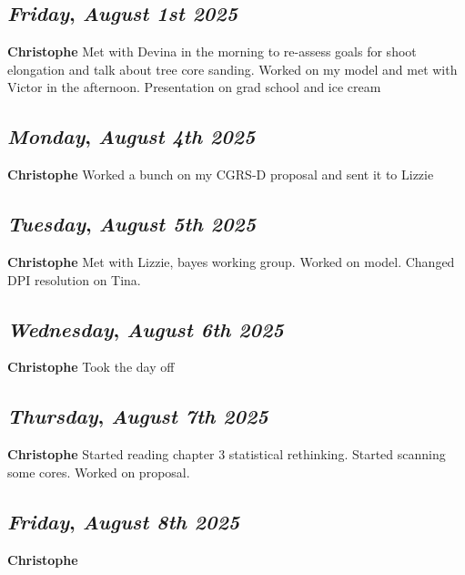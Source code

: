 \begin{center}
\section*{\month}
\end{center}

\def\day{\textit{August 1st 2025}}
\def\weekday{\textit{Friday}}
\subsection*{\weekday, \day}
\textbf {Christophe}
Met with Devina in the morning to re-assess goals for shoot elongation and talk about tree core sanding. Worked on my model and met with Victor in the afternoon. Presentation on grad school and ice cream

\def\day{\textit{August 4th 2025}}
\def\weekday{\textit{Monday}}
\subsection*{\weekday, \day}
\textbf {Christophe}
Worked a bunch on my CGRS-D proposal and sent it to Lizzie

\def\day{\textit{August 5th 2025}}
\def\weekday{\textit{Tuesday}}
\subsection*{\weekday, \day}
\textbf {Christophe}
Met with Lizzie, bayes working group. Worked on model. Changed DPI resolution on Tina.

\def\day{\textit{August 6th 2025}}
\def\weekday{\textit{Wednesday}}
\subsection*{\weekday, \day}
\textbf {Christophe}
Took the day off

\def\day{\textit{August 7th 2025}}
\def\weekday{\textit{Thursday}}
\subsection*{\weekday, \day}
\textbf {Christophe}
Started reading chapter 3 statistical rethinking. Started scanning some cores. Worked on proposal.

\def\day{\textit{August 8th 2025}}
\def\weekday{\textit{Friday}}
\subsection*{\weekday, \day}
\textbf {Christophe}

